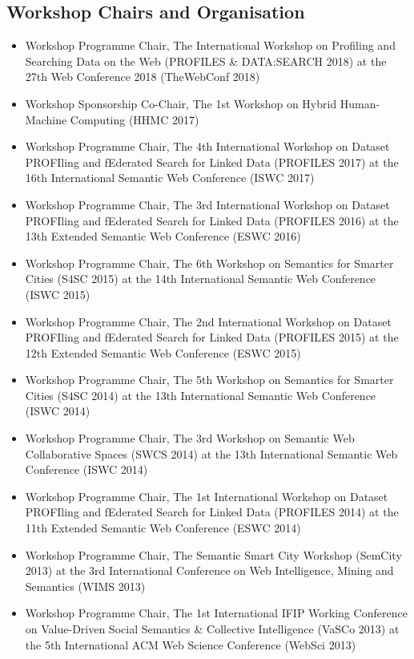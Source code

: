 \documentclass[10pt,a4paper]{res} %
\begin{document}
\begin{resume}
\subsection*{Workshop Chairs and Organisation}

\begin{itemize} \itemsep -2pt
\item Workshop Programme Chair, The International Workshop on Profiling and Searching Data on the Web (PROFILES \& DATA:SEARCH 2018) at the 27th Web Conference 2018 (TheWebConf 2018)
\item Workshop Sponsorship Co-Chair, The 1st Workshop on Hybrid Human-Machine Computing (HHMC 2017)
\item Workshop Programme Chair, The 4th International Workshop on Dataset PROFIling and fEderated Search for Linked Data (PROFILES 2017) at the 16th International Semantic Web Conference (ISWC 2017)
\item Workshop Programme Chair, The 3rd International Workshop on Dataset PROFIling and fEderated Search for Linked Data (PROFILES 2016) at the 13th Extended Semantic Web Conference (ESWC 2016)
\item Workshop Programme Chair, The 6th Workshop on Semantics for Smarter Cities (S4SC 2015) at the 14th International Semantic Web Conference (ISWC 2015)
\item Workshop Programme Chair, The 2nd International Workshop on Dataset PROFIling and fEderated Search for Linked Data (PROFILES 2015) at the 12th Extended Semantic Web Conference (ESWC 2015)
\item Workshop Programme Chair, The 5th Workshop on Semantics for Smarter Cities (S4SC 2014) at the 13th International Semantic Web Conference (ISWC 2014)
\item Workshop Programme Chair, The 3rd Workshop on Semantic Web Collaborative Spaces (SWCS 2014) at the 13th International Semantic Web Conference (ISWC 2014)
\item Workshop Programme Chair, The 1st International Workshop on Dataset PROFIling and fEderated Search for Linked Data (PROFILES 2014) at the 11th Extended Semantic Web Conference (ESWC 2014)
\item Workshop Programme Chair, The Semantic Smart City Workshop (SemCity 2013) at the 3rd International Conference on Web Intelligence, Mining and Semantics (WIMS 2013)
\item Workshop Programme Chair, The 1st International IFIP Working Conference on Value-Driven Social Semantics \& Collective Intelligence (VaSCo 2013) at the 5th International ACM Web Science Conference (WebSci 2013)

\end{itemize}
\end{resume}
\end{document}
